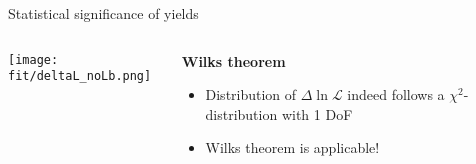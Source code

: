 \begin{frame}{Statistical significance of yields}
    \begin{columns}
        \begin{column}{.5\textwidth}
            \centering
            \texttt{[image: fit/deltaL\_noLb.png]}
        \end{column}
        \begin{column}{.5\textwidth}
            \textbf{Wilks theorem}
            \begin{itemize}
                \item Distribution of $\Delta \!\ln \mathcal{L}$ indeed follows a $\chi^2$-distribution with 1 DoF
                \item Wilks theorem is applicable!
            \end{itemize}
        \end{column}
    \end{columns}

    \vspace{5mm}
    
    \centering
\end{frame}


